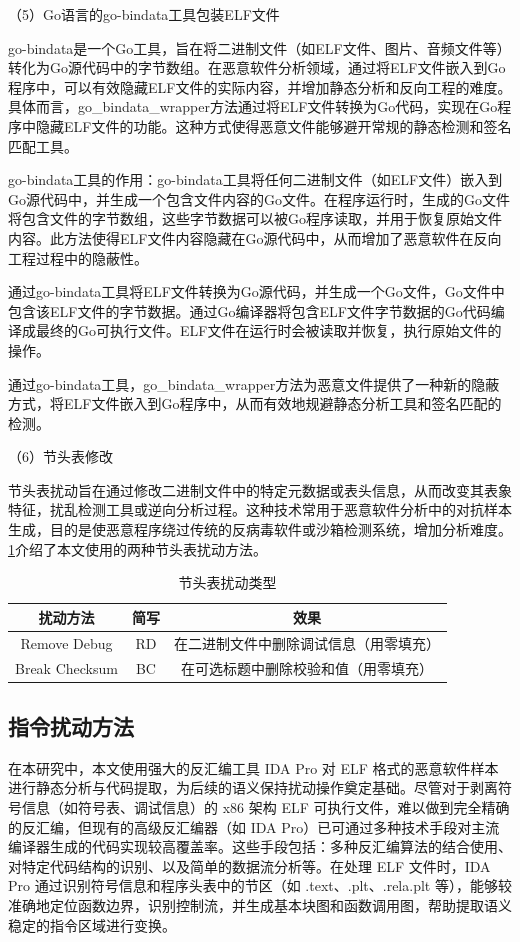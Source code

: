 （5）Go语言的go-bindata工具包装ELF文件

go-bindata是一个Go工具，旨在将二进制文件（如ELF文件、图片、音频文件等）转化为Go源代码中的字节数组。在恶意软件分析领域，通过将ELF文件嵌入到Go程序中，可以有效隐藏ELF文件的实际内容，并增加静态分析和反向工程的难度。具体而言，go\_bindata\_wrapper方法通过将ELF文件转换为Go代码，实现在Go程序中隐藏ELF文件的功能。这种方式使得恶意文件能够避开常规的静态检测和签名匹配工具。

go-bindata工具的作用：go-bindata工具将任何二进制文件（如ELF文件）嵌入到Go源代码中，并生成一个包含文件内容的Go文件。在程序运行时，生成的Go文件将包含文件的字节数组，这些字节数据可以被Go程序读取，并用于恢复原始文件内容。此方法使得ELF文件内容隐藏在Go源代码中，从而增加了恶意软件在反向工程过程中的隐蔽性。

通过go-bindata工具将ELF文件转换为Go源代码，并生成一个Go文件，Go文件中包含该ELF文件的字节数据。通过Go编译器将包含ELF文件字节数据的Go代码编译成最终的Go可执行文件。ELF文件在运行时会被读取并恢复，执行原始文件的操作。

通过go-bindata工具，go\_bindata\_wrapper方法为恶意文件提供了一种新的隐蔽方式，将ELF文件嵌入到Go程序中，从而有效地规避静态分析工具和签名匹配的检测。

（6）节头表修改

节头表扰动旨在通过修改二进制文件中的特定元数据或表头信息，从而改变其表象特征，扰乱检测工具或逆向分析过程。这种技术常用于恶意软件分析中的对抗样本生成，目的是使恶意程序绕过传统的反病毒软件或沙箱检测系统，增加分析难度。\ref{tab:4.5}介绍了本文使用的两种节头表扰动方法。

\begin{table}[htbp]
	\centering
	\caption{节头表扰动类型}\label{tab:4.5}
	\begin{tabular*}{0.9\textwidth}{@{\extracolsep{\fill}}ccc}
		\toprule
		扰动方法 & 简写 & 效果 \\
		\midrule
		Remove Debug & RD & 在二进制文件中删除调试信息（用零填充） \\
		Break Checksum & BC & 在可选标题中删除校验和值（用零填充） \\
		\bottomrule
	\end{tabular*}
\end{table}

\subsection{指令扰动方法}

在本研究中，本文使用强大的反汇编工具 IDA Pro 对 ELF 格式的恶意软件样本进行静态分析与代码提取，为后续的语义保持扰动操作奠定基础。尽管对于剥离符号信息（如符号表、调试信息）的 x86 架构 ELF 可执行文件，难以做到完全精确的反汇编，但现有的高级反汇编器（如 IDA Pro）已可通过多种技术手段对主流编译器生成的代码实现较高覆盖率。这些手段包括：多种反汇编算法的结合使用、对特定代码结构的识别、以及简单的数据流分析等。在处理 ELF 文件时，IDA Pro 通过识别符号信息和程序头表中的节区（如 .text、.plt、.rela.plt 等），能够较准确地定位函数边界，识别控制流，并生成基本块图和函数调用图，帮助提取语义稳定的指令区域进行变换。

